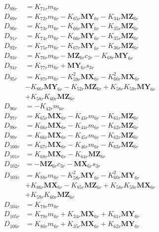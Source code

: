 \begin{multicols}{2}
\begin{align}
D_{88r} &= K_{71r}m_{6r} \nonumber \\
D_{89r} &= K_{72r}m_{6r} - K_{65r}\mathbf{MY}_{6r} - K_{34r}\mathbf{MZ}_{6r} \nonumber \\
D_{90r} &= K_{73r}m_{6r} - K_{66r}\mathbf{MY}_{6r} - K_{35r}\mathbf{MZ}_{6r} \nonumber \\
D_{91r} &= K_{74r}m_{6r} - K_{66r}\mathbf{MY}_{6r} - K_{35r}\mathbf{MZ}_{6r} \nonumber \\
D_{92r} &= K_{75r}m_{6r} - K_{67r}\mathbf{MY}_{6r} - K_{36r}\mathbf{MZ}_{6r} \nonumber \\
D_{93r} &= K_{76r}m_{6r} - \mathbf{MZ}_{6r}c_{2r} - K_{68r}\mathbf{MY}_{6r} \nonumber \\
D_{94r} &= K_{77r}m_{6r} + \mathbf{MY}_{6r}s_{3r} \nonumber \\
D_{95r} &= K_{87r}m_{6r} - K_{59r}^2\mathbf{MX}_{6r} - K_{60r}^2\mathbf{MX}_{6r}  \nonumber \\
&- K_{86r}\mathbf{MY}_{6r} - K_{52r}\mathbf{MZ}_{6r} + K_{58r}K_{59r}\mathbf{MY}_{6r}  \nonumber \\
&+ K_{58r}K_{60r}\mathbf{MZ}_{6r} \nonumber \\
D_{96r} &= -K_{42r}m_{6r} \nonumber \\
D_{97r} &= K_{65r}\mathbf{MX}_{6r} - K_{43r}m_{6r} - K_{61r}\mathbf{MZ}_{6r} \nonumber \\
D_{98r} &= K_{66r}\mathbf{MX}_{6r} - K_{44r}m_{6r} - K_{62r}\mathbf{MZ}_{6r} \nonumber \\
D_{99r} &= K_{66r}\mathbf{MX}_{6r} - K_{45r}m_{6r} - K_{62r}\mathbf{MZ}_{6r} \nonumber \\
D_{100r} &= K_{67r}\mathbf{MX}_{6r} - K_{46r}m_{6r} - K_{63r}\mathbf{MZ}_{6r} \nonumber \\
D_{101r} &= K_{68r}\mathbf{MX}_{6r} - K_{64r}\mathbf{MZ}_{6r} \nonumber \\
D_{102r} &= - \mathbf{MZ}_{6r}c_{3r} - \mathbf{MX}_{6r}s_{3r} \nonumber \\
D_{103r} &= K_{88r}m_{6r} - K_{58r}^2\mathbf{MY}_{6r} - K_{60r}^2\mathbf{MY}_{6r}  \nonumber \\
&+ K_{86r}\mathbf{MX}_{6r} - K_{85r}\mathbf{MZ}_{6r} + K_{58r}K_{59r}\mathbf{MX}_{6r}  \nonumber \\
&+ K_{59r}K_{60r}\mathbf{MZ}_{6r} \nonumber \\
D_{104r} &= K_{78r}m_{6r} \nonumber \\
D_{105r} &= K_{79r}m_{6r} + K_{34r}\mathbf{MX}_{6r} + K_{61r}\mathbf{MY}_{6r} \nonumber \\
D_{106r} &= K_{80r}m_{6r} + K_{35r}\mathbf{MX}_{6r} + K_{62r}\mathbf{MY}_{6r} \nonumber \\

\end{align}
\end{multicols}
